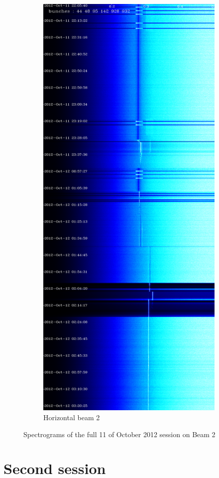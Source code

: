 \begin{figure}[H]
\begin{subfigure}{.5\textwidth}
  \centering
  \includegraphics[width=.8\linewidth]{md-121011-hb2-bunches111111-16.png}
  \caption{Horizontal beam 2}
\end{subfigure}
\caption{Spectrograms of the full 11 of October 2012 session on Beam 2}
\end{figure}

\section{Second session}

